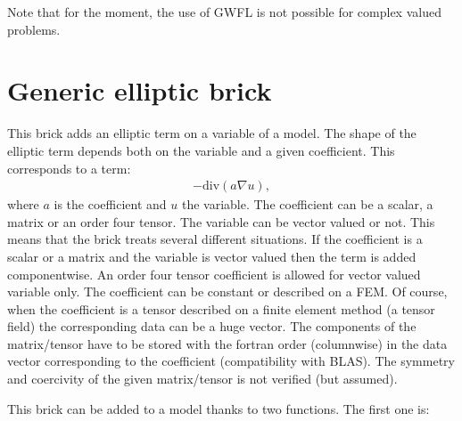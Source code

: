 \documentclass[a4paper,11pt,english]{sphinxmanual}
\begin{document}
Note that for the moment, the use of GWFL is not possible for complex valued problems.

\ignorespaces 

\section{Generic elliptic brick}
\label{\detokenize{userdoc/model_generic_elliptic:generic-elliptic-brick}}\label{\detokenize{userdoc/model_generic_elliptic:ud-model-generic-elliptic}}\label{\detokenize{userdoc/model_generic_elliptic:index-0}}\label{\detokenize{userdoc/model_generic_elliptic::doc}}
This brick adds an elliptic term on a variable of a model.  The shape of the
elliptic term depends both on the variable and a given coefficient. This
corresponds to a term:
\begin{equation*}
\begin{split}-\text{div}(a\nabla u),\end{split}
\end{equation*}
where \(a\) is the coefficient and \(u\) the variable. The coefficient can
be a scalar, a matrix or an order four tensor. The variable can be vector valued
or not. This means that the brick treats several different situations. If the
coefficient is a scalar or a matrix and the variable is vector valued then the
term is added componentwise. An order four tensor coefficient is allowed for
vector valued variable only.  The coefficient can be constant or described on a
FEM. Of course, when the coefficient is a tensor described on a finite element
method (a tensor field) the corresponding data can be a huge vector. The
components of the matrix/tensor have to be stored with the fortran order
(columnwise) in the data vector corresponding to the coefficient (compatibility
with BLAS). The symmetry and coercivity of the given matrix/tensor is not verified
(but assumed).

This brick can be added to a model  thanks to two functions. The first one
is:

\begin{sphinxVerbatim}[commandchars=\\\{\}]
      
\end{sphinxVerbatim}
\end{document}
